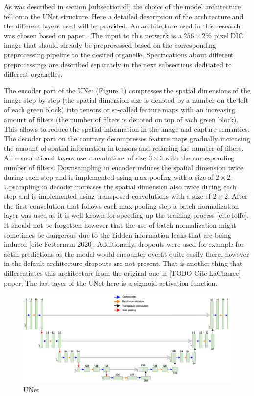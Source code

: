 As was described in section \ref{subsection:dl} the choice of the model architecture fell onto the UNet structure. Here a detailed description of the architecture and the different layers used will be provided. An architecture used in this research was chosen based on paper \cite{Lachance_2020}. The input to this network is a $256 \times 256$ pixel DIC image that should already be preprocessed based on the corresponding preprocessing pipeline to the desired organelle. Specifications about different preprocessings are described separately in the next subsections dedicated to different organelles.

The encoder part of the UNet (Figure \ref{fig:unet}) compresses the spatial dimensions of the image step by step (the spatial dimension size is denoted by a number on the left of each green block) into tensors or so-called feature maps with an increasing amount of filters (the number of filters is denoted on top of each green block). This allows to reduce the spatial information in the image and capture semantics. The decoder part on the contrary decompresses feature maps gradually increasing the amount of spatial information in tensors and reducing the number of filters. All convolutional layers use convolutions of size $3 \times 3$ with the corresponding number of filters. Downsampling in encoder reduces the spatial dimension twice during each step and is implemented using max-pooling with a size of $2 \times 2$. Upsampling in decoder increases the spatial dimension also twice during each step and is implemented using transposed convolutions with a size of $2 \times 2$. After the first convolution that follows each max-pooling step a batch normalization layer was used as it is well-known for speeding up the training process [cite Ioffe]. It should not be forgotten however that the use of batch normalization might sometimes be dangerous due to the hidden information leaks that are being induced [cite Fetterman 2020]. Additionally, dropouts were used for example for actin predictions as the model would encounter overfit quite easily there, however in the default architecture dropouts are not present. That is another thing that differentiates this architecture from the original one in [TODO Cite LaChance] paper. The last layer of the UNet here is a sigmoid activation function.
\begin{figure}[htb]
	\begin{center}
		\includegraphics[width=\linewidth]{bilder/Unet.png}
		\caption{UNet}\label{fig:unet}
	\end{center}
\end{figure}

